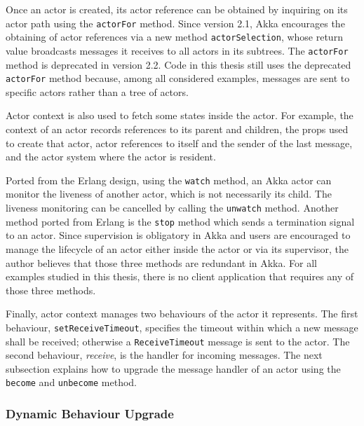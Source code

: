 Once an actor is created, its actor reference can be obtained by inquiring on 
its actor path using the {\tt actorFor} method.  Since version 2.1, Akka 
encourages the obtaining of actor references via a new method 
{\tt actorSelection}, whose return value broadcasts messages it receives to all 
actors in its subtrees.  The {\tt actorFor} method is deprecated in version 
2.2. Code in this thesis still uses the deprecated {\tt actorFor} method 
because, among all considered examples, messages are sent to specific actors
rather than a tree of actors.

Actor context is also used to fetch some states inside the actor.  For example,
the context of an actor records references to its parent and children, the props
used to create that actor, actor references to itself and the sender of the last
message, and the actor system where the actor is resident.

Ported from the Erlang design, using the {\tt watch} method, an Akka actor can 
monitor the liveness of another actor, which is not necessarily its child.  The 
liveness monitoring can be cancelled by calling the {\tt unwatch} method.  
Another method ported from Erlang is the {\tt stop} method which sends a 
termination signal to an actor.  Since supervision is obligatory in Akka and 
users are encouraged to manage the lifecycle of an actor either inside the 
actor or via its supervisor, the author believes that those three methods are 
redundant in Akka.  For all examples studied in this thesis, there is no client 
application that requires any of those three methods.

Finally, actor context manages two behaviours of the actor it represents.  The 
first behaviour, {\tt setReceiveTimeout}, specifies the timeout within which a 
new message shall be received; otherwise a {\tt  ReceiveTimeout} message is sent to the 
actor.  The second behaviour, {\it receive}, is the handler for 
incoming messages.  The next subsection explains how to upgrade the message 
handler of an actor using the {\tt become} and {\tt unbecome} method.


\subsubsection{Dynamic Behaviour Upgrade}
\label{akka_hot_swap}

